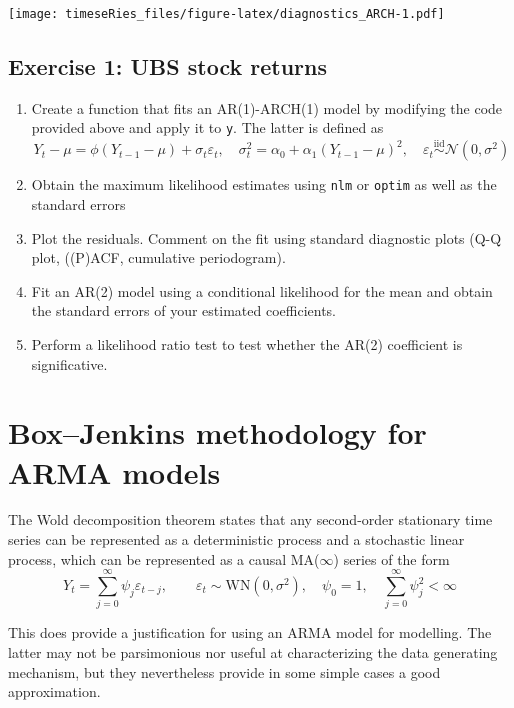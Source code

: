 \documentclass[]{book}
\providecommand{\tightlist}{%
  \setlength{\itemsep}{0pt}\setlength{\parskip}{0pt}}
\begin{document}
\texttt{[image: timeseRies\_files/figure-latex/diagnostics\_ARCH-1.pdf]}

\hypertarget{exercise-1-ubs-stock-returns}{%
\subsection{Exercise 1: UBS stock
returns}\label{exercise-1-ubs-stock-returns}}

\begin{enumerate}
\def\labelenumi{\arabic{enumi}.}
\tightlist
\item
  Create a function that fits an AR(1)-ARCH(1) model by modifying the
  code provided above and apply it to \texttt{y}. The latter is defined
  as
  \[Y_t-\mu = \phi(Y_{t-1}-\mu)+\sigma_t\varepsilon_t, \quad \sigma^2_t = \alpha_0+\alpha_1(Y_{t-1}-\mu)^2, \quad \varepsilon_t \stackrel{\mathrm{iid}}{\sim} \mathcal{N}(0,\sigma^2)\]
\item
  Obtain the maximum likelihood estimates using \texttt{nlm} or
  \texttt{optim} as well as the standard errors
\item
  Plot the residuals. Comment on the fit using standard diagnostic plots
  (Q-Q plot, ((P)ACF, cumulative periodogram).
\item
  Fit an AR(2) model using a conditional likelihood for the mean and
  obtain the standard errors of your estimated coefficients.
\item
  Perform a likelihood ratio test to test whether the AR(2) coefficient
  is significative.
\end{enumerate}

\hypertarget{boxjenkins-methodology-for-arma-models}{%
\section{Box--Jenkins methodology for ARMA
models}\label{boxjenkins-methodology-for-arma-models}}

The Wold decomposition theorem states that any second-order stationary
time series can be represented as a deterministic process and a
stochastic linear process, which can be represented as a causal
MA(\(\infty\)) series of the form
\[Y_t = \sum_{j = 0}^\infty \psi_j\varepsilon_{t-j}, \qquad \varepsilon_t \sim \mathrm{WN}(0, \sigma^2),\quad \psi_0 = 1, \quad\sum_{j = 0}^\infty \psi_j^2 < \infty\]

This does provide a justification for using an ARMA model for modelling.
The latter may not be parsimonious nor useful at characterizing the data
generating mechanism, but they nevertheless provide in some simple cases
a good approximation.
\end{document}
